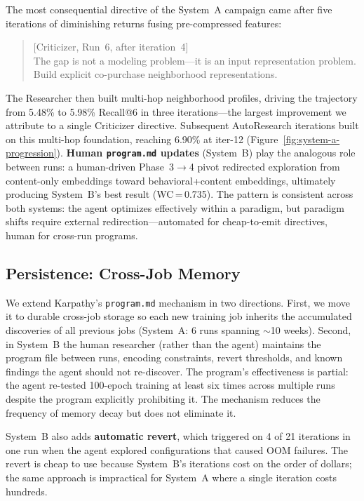 \documentclass[conference]{IEEEtran}
\begin{document}
The most consequential directive of the System~A campaign came after five iterations of diminishing returns fusing pre-compressed features:

\begin{quote}
\itshape\raggedright
\textcolor{black!75}{[Criticizer, Run~6, after iteration~4]}\\
The gap is not a modeling problem---it is an input representation problem. Build explicit co-purchase neighborhood representations.
\end{quote}

\noindent The Researcher then built multi-hop neighborhood profiles, driving the trajectory from 5.48\% to 5.98\% Recall@6 in three iterations---the largest improvement we attribute to a single Criticizer directive. Subsequent AutoResearch iterations built on this multi-hop foundation, reaching 6.90\% at iter-12 (Figure~\ref{fig:system-a-progression}). \textbf{Human \texttt{program.md} updates} (System~B) play the analogous role between runs: a human-driven Phase~3$\to$4 pivot redirected exploration from content-only embeddings toward behavioral+content embeddings, ultimately producing System~B's best result (WC\,=\,0.735). The pattern is consistent across both systems: the agent optimizes effectively within a paradigm, but paradigm shifts require external redirection---automated for cheap-to-emit directives, human for cross-run programs.

\subsection{Persistence: Cross-Job Memory}

We extend Karpathy's \texttt{program.md} mechanism in two directions. First, we move it to durable cross-job storage so each new training job inherits the accumulated discoveries of all previous jobs (System~A: 6 runs spanning ${\sim}$10 weeks). Second, in System~B the human researcher (rather than the agent) maintains the program file between runs, encoding constraints, revert thresholds, and known findings the agent should not re-discover. The program's effectiveness is partial: the agent re-tested 100-epoch training at least six times across multiple runs despite the program explicitly prohibiting it. The mechanism reduces the frequency of memory decay but does not eliminate it.

System~B also adds \textbf{automatic revert}, which triggered on 4 of 21 iterations in one run when the agent explored configurations that caused OOM failures. The revert is cheap to use because System~B's iterations cost on the order of dollars; the same approach is impractical for System~A where a single iteration costs hundreds.
\end{document}
